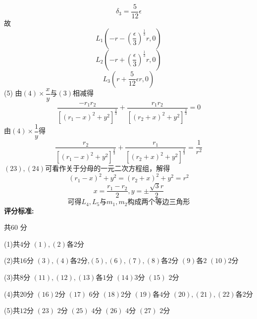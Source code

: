 \documentclass{article}
\begin{document}
\[
\delta_3=\dfrac{5}{12}\epsilon\tag{19}
\]
故
\[
L_1\left(-r-(\dfrac{\epsilon}{3})^{\frac{1}{3}}r,0\right)\tag{20}
\]
\[
L_2\left(-r+(\dfrac{\epsilon}{3})^{\frac{1}{3}}r,0\right)\tag{21}
\]
\[
L_3\left(r+\dfrac{5}{12}\epsilon r,0\right)\tag{22}
\]
(5)
由$(4)\times \dfrac{x}{y}$与$(3)$相减得
\[
\dfrac{-r_1 r_2}{[(r_1-x)^2+y^2]^{\frac{2}{3}}}
+\dfrac{r_1 r_2}{[(r_2+x)^2+y^2]^{\frac{2}{3}}}
=0\tag{23}
\]
由$(4)\times \dfrac{1}{y}$得
\[
\dfrac{r_2}{[(r_1-x)^2+y^2]^{\frac{2}{3}}}
+\dfrac{r_1}{[(r_2+x)^2+y^2]^{\frac{2}{3}}}
=\dfrac{1}{r^2}\tag{24}
\]
$(23),(24)$可看作关于分母的一元二次方程组，解得
\[
(r_1-x)^2+y^2=(r_2+x)^2+y^2=r^2\tag{25}
\]
\[
x=\dfrac{r_1-r_2}{2},y=\pm\dfrac{\sqrt{3}r}{2}\tag{26}
\]
\[
可得L_4,L_5与 m_1,m_2构成两个等边三角形\tag{27}
\]
\textbf{评分标准:}\par
共$60$ 分\par
(1)共$4$分 $(1),(2)$各$2$分\par
(2)共$16$分 $(3),(4)$各$2$分,$(5),(6),(7),(8)$各$2$分 $(9)$各$2$ $(10)$$2$分\par
(3)共$8$分 $(11),(12),(13)$各$1$分 $(14)$$3$分 $(15)$ $2$分\par
(4)共$20$分 $(16)$$2$分 $(17)$ $6$分 $(18)$$2$分 $(19)$各$4$分 $(20),(21),(22)$各$2$分\par
(5)共$12$分 $(23)$ $2$分 $(25)$ $4$分 $(26)$ $4$分 $(27)$ $2$分\par
\end{document}
